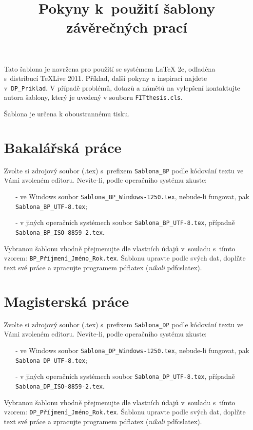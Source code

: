 \documentclass[a4paper,final]{article}
\title{Pokyny k~použití šablony závěrečných prací}
\author{}
\date{}
\begin{document}
\maketitle

\thispagestyle{empty}

Tato šablona je navržena pro použití se systémem \LaTeX{} 2e, odladěna s~distribucí TeXLive 2011. Příklad, další pokyny a inspiraci najdete v~\verb|DP_Priklad|. V případě problémů, dotazů a námětů na vylepšení kontaktujte autora šablony, který je uvedený v souboru \verb|FITthesis.cls|.

Šablona je určena k oboustrannému tisku.

\section{Bakalářská práce}

Zvolte si zdrojový soubor (.tex) s~prefixem \verb|Sablona_BP| podle kódování textu ve Vámi zvoleném editoru. Nevíte-li, podle operačního systému zkuste:
\begin{itemize}
	\item[-] ve Windows soubor \verb|Sablona_BP_Windows-1250.tex|, nebude-li fungovat, pak \verb|Sablona_BP_UTF-8.tex|;
	\item[-] v jiných operačních systémech soubor \verb|Sablona_BP_UTF-8.tex|, případně \verb|Sablona_BP_ISO-8859-2.tex|.
\end{itemize}

Vybranou šablonu vhodně přejmenujte dle vlastních údajů v~souladu s~tímto vzorem: \verb|BP_Příjmení_Jméno_Rok.tex|. Šablonu upravte podle svých dat, doplňte text své práce a zpracujte programem pdflatex (\emph{nikoli} pdfcslatex).

\section{Magisterská práce}

Zvolte si zdrojový soubor (.tex) s~prefixem \verb|Sablona_DP| podle kódování textu ve Vámi zvoleném editoru. Nevíte-li, podle operačního systému zkuste:
\begin{itemize}
	\item[-] ve Windows soubor \verb|Sablona_DP_Windows-1250.tex|, nebude-li fungovat, pak \verb|Sablona_DP_UTF-8.tex|;
	\item[-] v jiných operačních systémech soubor \verb|Sablona_DP_UTF-8.tex|, případně \verb|Sablona_DP_ISO-8859-2.tex|.
\end{itemize}

Vybranou šablonu vhodně přejmenujte dle vlastních údajů v~souladu s~tímto vzorem: \verb|DP_Příjmení_Jméno_Rok.tex|. Šablonu upravte podle svých dat, doplňte text své práce a zpracujte programem pdflatex (\emph{nikoli} pdfcslatex).
\end{document}
